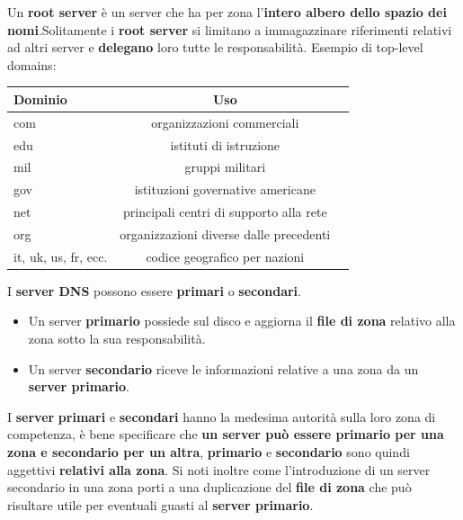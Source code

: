 \documentclass[11pt,a4paper,oneside]{book}
\theoremstyle{definition}
\begin{document}
\pagebreak

Un \textbf{root server} è un server che ha per zona l'\textbf{intero albero dello spazio dei nomi}.\newline Solitamente i \textbf{root server} si limitano a immagazzinare riferimenti relativi ad altri server e \textbf{delegano} loro tutte le responsabilità.\newline
Esempio di top-level domains:
\begin{table}[h!]
	\begin{center}
		\label{tab:table1}
		\begin{tabular}{l|c|r}
			\textbf{Dominio}     & \textbf{Uso}                            \\
			\hline
			com                  & organizzazioni commerciali              \\
			edu                  & istituti di istruzione                  \\
			mil                  & gruppi militari                         \\
			gov                  & istituzioni governative americane       \\
			net                  & principali centri di supporto alla rete \\
			org                  & organizzazioni diverse dalle precedenti \\
			it, uk, us, fr, ecc. & codice geografico per nazioni
			\\
		\end{tabular}
	\end{center}
\end{table}\newline
I \textbf{server DNS} possono essere \textbf{primari} o \textbf{secondari}.
\begin{itemize}
	\item Un server \textbf{primario} possiede sul disco e aggiorna il \textbf{file di zona} relativo alla zona sotto la sua responsabilità.
	\item Un server \textbf{secondario} riceve le informazioni relative a una zona da un \textbf{server primario}.
\end{itemize}
I \textbf{server} \textbf{primari} e \textbf{secondari} hanno la medesima autorità sulla loro zona di competenza, è bene specificare che \textbf{un server può essere primario per una zona  e secondario per un altra}, \textbf{primario} e \textbf{secondario} sono quindi aggettivi \textbf{relativi alla zona}. Si noti inoltre come l'introduzione di un server secondario in una zona porti a una duplicazione del \textbf{file di zona} che può risultare utile per eventuali guasti al \textbf{server primario}.
\end{document}

